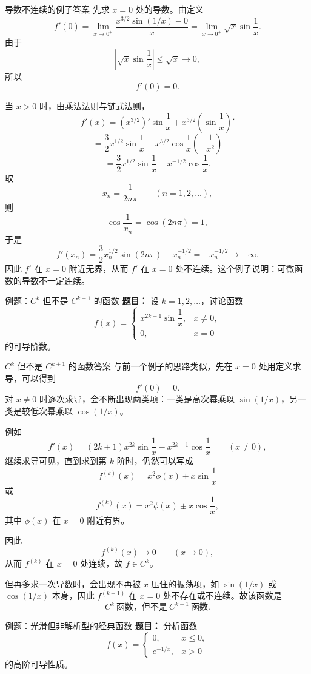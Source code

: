 ﻿\documentclass[aspectratio=169,11pt]{ctexbeamer}
\begin{document}
\begin{frame}[allowframebreaks]{导数不连续的例子答案}
\small
先求 $x=0$ 处的导数。由定义
\[
f'(0)=\lim_{x\to0^+}\frac{x^{3/2}\sin(1/x)-0}{x}
=\lim_{x\to0^+}\sqrt{x}\sin\frac1x.
\]
由于
\[
\left|\sqrt{x}\sin\frac1x\right|\le \sqrt{x}\to0,
\]
所以
\[
f'(0)=0.
\]

当 $x>0$ 时，由乘法法则与链式法则，
\[
f'(x)=\left(x^{3/2}\right)'\sin\frac1x+x^{3/2}\left(\sin\frac1x\right)'
\]
\[
=\frac32x^{1/2}\sin\frac1x+x^{3/2}\cos\frac1x\left(-\frac1{x^2}\right)
\]
\[
=\frac32x^{1/2}\sin\frac1x-x^{-1/2}\cos\frac1x.
\]
取
\[
x_n=\frac1{2n\pi}\qquad (n=1,2,\dots),
\]
则
\[
\cos\frac1{x_n}=\cos(2n\pi)=1,
\]
于是
\[
f'(x_n)=\frac32x_n^{1/2}\sin(2n\pi)-x_n^{-1/2}
=-x_n^{-1/2}\to-\infty.
\]
因此 $f'$ 在 $x=0$ 附近无界，从而 $f'$ 在 $x=0$ 处不连续。这个例子说明：\alert{可微函数的导数不一定连续}。
\end{frame}

\begin{frame}{例题：$C^k$ 但不是 $C^{k+1}$ 的函数}
\small
\textbf{题目：} 设 $k=1,2,\dots$，讨论函数
\[
f(x)=
\begin{cases}
x^{2k+1}\sin\dfrac1x,&x\ne0,\\
0,&x=0
\end{cases}
\]
的可导阶数。
\end{frame}

\begin{frame}[allowframebreaks]{$C^k$ 但不是 $C^{k+1}$ 的函数答案}
\small
与前一个例子的思路类似，先在 $x=0$ 处用定义求导，可以得到
\[
f'(0)=0.
\]
对 $x\ne0$ 时逐次求导，会不断出现两类项：一类是高次幂乘以 $\sin(1/x)$，另一类是较低次幂乘以 $\cos(1/x)$。

\vspace{0.4em}
例如
\[
f'(x)=(2k+1)x^{2k}\sin\frac1x-x^{2k-1}\cos\frac1x\qquad (x\ne0),
\]
继续求导可见，直到求到第 $k$ 阶时，仍然可以写成
\[
f^{(k)}(x)=x^2\phi(x)\pm x\sin\frac1x
\]
或
\[
f^{(k)}(x)=x^2\phi(x)\pm x\cos\frac1x,
\]
其中 $\phi(x)$ 在 $x=0$ 附近有界。

因此
\[
f^{(k)}(x)\to0\qquad (x\to0),
\]
从而 $f^{(k)}$ 在 $x=0$ 处连续，故 $f\in C^k$。

\vspace{0.4em}
但再多求一次导数时，会出现不再被 $x$ 压住的振荡项，如 $\sin(1/x)$ 或 $\cos(1/x)$ 本身，因此 $f^{(k+1)}$ 在 $x=0$ 处不存在或不连续。故该函数是
\[
C^k\ \text{函数，但不是}\ C^{k+1}\ \text{函数}.
\]
\end{frame}

\begin{frame}{例题：光滑但非解析型的经典函数}
\small
\textbf{题目：} 分析函数
\[
f(x)=
\begin{cases}
0,&x\le0,\\
e^{-1/x},&x>0
\end{cases}
\]
的高阶可导性质。
\end{frame}
\end{document}
